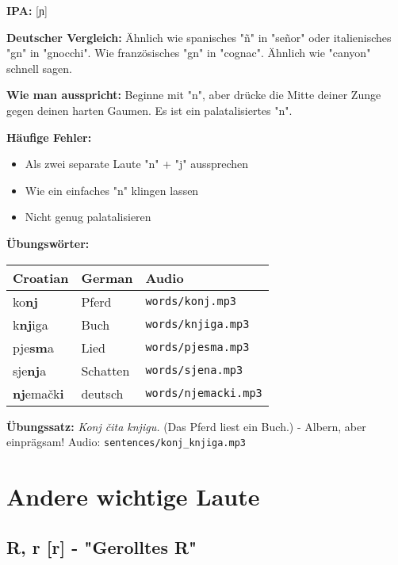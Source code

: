 \begin{tcolorbox}[breakable, colback=lightgreen!30, colframe=green!60!black, title=\textbf{Nj, nj}]

\textbf{IPA:} [ɲ]

\textbf{Deutscher Vergleich:}
Ähnlich wie spanisches "ñ" in "señor" oder italienisches "gn" in "gnocchi". Wie französisches "gn" in "cognac". Ähnlich wie "canyon" schnell sagen.

\textbf{Wie man ausspricht:}
Beginne mit "n", aber drücke die Mitte deiner Zunge gegen deinen harten Gaumen. Es ist ein palatalisiertes "n".

\textbf{Häufige Fehler:}
\begin{itemize}
    \item Als zwei separate Laute "n" + "j" aussprechen
    \item Wie ein einfaches "n" klingen lassen
    \item Nicht genug palatalisieren
\end{itemize}

\textbf{Übungswörter:}
\begin{center}
\small
\begin{tabular}{lll}
\textbf{Croatian} & \textbf{German} & \textbf{Audio} \\
\midrule
ko\textbf{nj} & Pferd & \small\texttt{words/konj.mp3} \\
k\textbf{nj}iga & Buch & \small\texttt{words/knjiga.mp3} \\
pje\textbf{sm}a & Lied & \small\texttt{words/pjesma.mp3} \\
sje\textbf{nj}a & Schatten & \small\texttt{words/sjena.mp3} \\
\textbf{nj}emačk\textbf{i} & deutsch & \small\texttt{words/njemacki.mp3} \\
\end{tabular}
\end{center}

\textbf{Übungssatz:}
\textit{Konj čita knjigu.}
(Das Pferd liest ein Buch.) - Albern, aber einprägsam!
Audio: \small\texttt{sentences/konj\_knjiga.mp3}

\end{tcolorbox}

\section{Andere wichtige Laute}

\subsection{R, r [r] - "Gerolltes R"}

